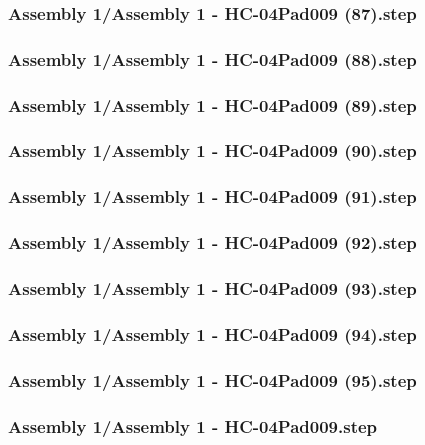 \documentclass[a4paper,12pt]{article}
\begin{document}
\subsubsection{Assembly 1/Assembly 1 - HC-04Pad009 (87).step}

\subsubsection{Assembly 1/Assembly 1 - HC-04Pad009 (88).step}

\subsubsection{Assembly 1/Assembly 1 - HC-04Pad009 (89).step}

\subsubsection{Assembly 1/Assembly 1 - HC-04Pad009 (90).step}

\subsubsection{Assembly 1/Assembly 1 - HC-04Pad009 (91).step}

\subsubsection{Assembly 1/Assembly 1 - HC-04Pad009 (92).step}

\subsubsection{Assembly 1/Assembly 1 - HC-04Pad009 (93).step}

\subsubsection{Assembly 1/Assembly 1 - HC-04Pad009 (94).step}

\subsubsection{Assembly 1/Assembly 1 - HC-04Pad009 (95).step}

\subsubsection{Assembly 1/Assembly 1 - HC-04Pad009.step}

\end{document}
